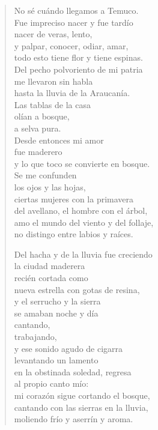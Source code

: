 \documentclass[12pt]{article}
\begin{document}
\clearpage
{}
\begin{verse}

No sé cuándo llegamos a Temuco.\\
Fue impreciso nacer y fue tardío\\
nacer de veras, lento,\\
y palpar, conocer, odiar, amar,\\
todo esto tiene flor y tiene espinas.\\
Del pecho polvoriento de mi patria\\
me llevaron sin habla\\
hasta la lluvia de la Araucanía.\\
Las tablas de la casa\\
olían a bosque,\\
a selva pura.\\
Desde entonces mi amor\\
fue maderero\\
y lo que toco se convierte en bosque.\\
Se me confunden\\
los ojos y las hojas,\\
ciertas mujeres con la primavera\\
del avellano, el hombre con el árbol,\\
amo el mundo del viento y del follaje,\\
no distingo entre labios y raíces.  

Del hacha y de la lluvia fue creciendo\\
la ciudad maderera\\
recién cortada como\\
nueva estrella con gotas de resina,\\
y el serrucho y la sierra\\
se amaban noche y día\\
cantando,\\
trabajando,\\
y ese sonido agudo de cigarra\\
levantando un lamento\\
en la obstinada soledad, regresa\\
al propio canto mío:\\
mi corazón sigue cortando el bosque,\\
cantando con las sierras en la lluvia,\\
moliendo frío y aserrín y aroma.  

\end{verse}
\end{document}
